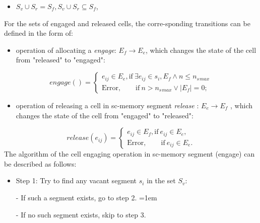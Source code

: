 \documentclass{scndocument}
\begin{document}
\begin{SCn}
\begin{multicols}{2}
\begin{itemize}
\item \textit {$S_v \cup  S_r = S_f, S_v \cup S_r \subseteq S_f $},
\end{itemize}
For the sets of engaged and released cells, the corre-sponding transitions can be defined in the form of:
\begin{itemize} 
\item operation of allocating a \textit{engage}: {$E_f \xrightarrow{} E_e$}, which
changes the state of the cell from "released" to
"engaged":
\end{itemize}
\begin{equation*} 
engage() = 
 \begin{cases}
 e_{ij} \in E_e, \text{if} \ \exists e_{ij} \in s_i, E_f \wedge n \leq n_s{}_{max} \\
\text{Error}, \qquad \text{if} \    n > n_s{}_{max} \vee |E_f| = 0;
 \end{cases}
\end{equation*}
\begin{itemize} 
\item operation of releasing a cell in sc-memory segment
\textit{release} : {$E_e \xrightarrow{} E_f$} , which changes the state of the
cell from "engaged" to "released":
\end{itemize}
\begin{equation*}
release(e_{ij}) = 
 \begin{cases}
 e_{ij} \in E_f, \text{if} \ e_{ij} \in E_e, \\
\text{Error}, \qquad \text{if} \  e_{ij} \in E_e.

 \end{cases}
\end{equation*}
The algorithm of the cell engaging operation in sc-memory segment (engage) can be described as follows:
\begin{itemize} 
\item  Step 1: Try to find any vacant segment $s_i$
in the set $S_v$: 

\item[-] If such a segment exists, go to step 2. \leftskip=1em
\item[-] If no such segment exists, skip to step 3.


\end{itemize}
\end{multicols}
\end{SCn}
\end{document}
